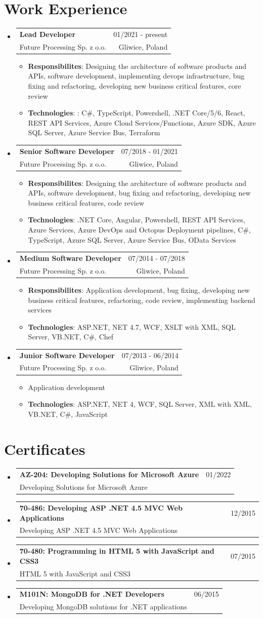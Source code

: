 \documentclass[A4,11pt]{article}
\makeatletter
\newcommand{\CVItem}[1]{
  \item\small{
    {#1 \vspace{-2pt}}
  }
}
\newcommand{\CVSubheading}[4]{
  \vspace{-2pt}\item
    \begin{tabular*}{0.97\textwidth}[t]{l@{\extracolsep{\fill}}r}
      \textbf{#1} & #2 \\
      \small#3 & \small #4 \\
    \end{tabular*}\vspace{-7pt}
}
\newcommand{\CVSubHeadingListStart}{\begin{itemize}[leftmargin=0.5cm, label={}]}
\newcommand{\CVSubHeadingListEnd}{\end{itemize}}
\newcommand{\CVItemListStart}{\begin{itemize}}
\newcommand{\CVItemListEnd}{\end{itemize}\vspace{-5pt}}
\makeatother
\begin{document}

\section{Work Experience}
  \CVSubHeadingListStart
    \CVSubheading
      {Lead Developer}{01/2021 - present}
      {Future Processing Sp. z o.o.}{Gliwice, Poland}
      \CVItemListStart
        \CVItem{\textbf{Responsibilites}: Designing the architecture of software products and APIs, software development, implementing devops infrastructure, bug fixing and refactoring, developing new business critical features, core review}
        \CVItem{\textbf{Technologies}: : C\#, TypeScript, Powershell, .NET Core/5/6, React, REST API Services, Azure Cloud Services/Functions, Azure SDK, Azure SQL Server, Azure Service Bus, Terraform}
      \CVItemListEnd
    \CVSubheading
      {Senior Software Developer}{07/2018 - 01/2021}
      {Future Processing Sp. z o.o.}{Gliwice, Poland}
      \CVItemListStart
        \CVItem{\textbf{Responsibilites}: Designing the architecture of software products and APIs, software development, bug fixing and refactoring, developing new business critical features, code review}
        \CVItem{\textbf{Technologies}: .NET Core, Angular, Powershell, REST API Services, Azure Services, Azure DevOps and Octopus Deployment pipelines, C\#, TypeScript, Azure SQL Server, Azure Service Bus, OData Services}
      \CVItemListEnd
    \CVSubheading
      {Medium Software Developer}{07/2014 - 07/2018}
      {Future Processing Sp. z o.o.}{Gliwice, Poland}
      \CVItemListStart
        \CVItem{\textbf{Responsibilites}: 
        Application development, bug fixing, developing new business critical features, refactoring, code review, implementing backend services}
        \CVItem{\textbf{Technologies}: ASP.NET, NET 4.7, WCF, XSLT with XML, SQL Server, VB.NET, C\#, Chef}
      \CVItemListEnd
    \CVSubheading
      {Junior Software Developer}{07/2013 - 06/2014}
      {Future Processing Sp. z o.o.}{Gliwice, Poland}
      \CVItemListStart
        \CVItem{Application development}
        \CVItem{\textbf{Technologies}: ASP.NET, NET 4, WCF, SQL Server, XML with XML, VB.NET, C\#, JavaScript}
      \CVItemListEnd
  \CVSubHeadingListEnd

\section{Certificates}
  \CVSubHeadingListStart
    \CVSubheading
      {AZ-204: Developing Solutions for Microsoft Azure}{01/2022}
      {Developing Solutions for Microsoft Azure}{}
    \CVSubheading
      {70-486: Developing ASP .NET 4.5 MVC Web Applications}{12/2015}
      {Developing ASP .NET 4.5 MVC Web Applications}{}
    \CVSubheading
      {70-480: Programming in HTML 5 with JavaScript and CSS3}{07/2015}
      {HTML 5 with JavaScript and CSS3}{}
    \CVSubheading
      {M101N: MongoDB for .NET Developers}{06/2015}
      {Developing MongoDB solutions for .NET applications}{}
  \CVSubHeadingListEnd
\end{document}
